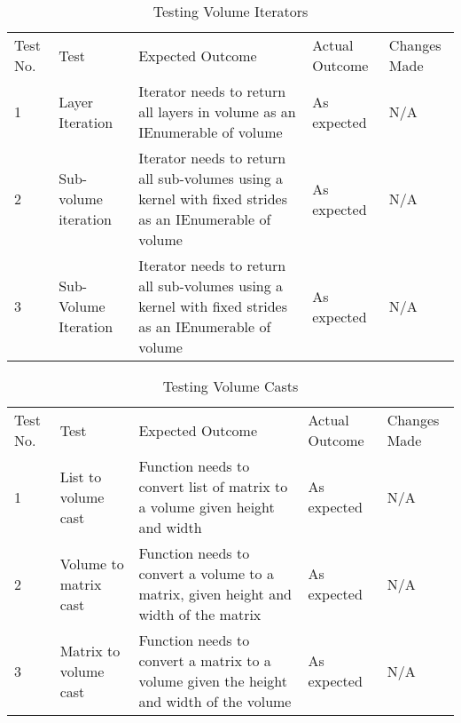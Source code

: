 \begin{table}[H]
\centering
    \begin{tabular}{|p{1cm}|p{4cm}|p{4cm}|p{3cm}|p{2cm}|}
        \hline
        Test No. & Test & Expected Outcome & Actual Outcome & Changes Made \\ \cline{1-5} 
        1 & Layer Iteration & Iterator needs to return all layers in volume as an IEnumerable of volume & As expected & N/A \\
        \cline{1-5}
        2 & Sub-volume iteration & Iterator needs to return all sub-volumes using a kernel with fixed strides as an IEnumerable of volume & As expected & N/A \\
        \cline{1-5}
        3 & Sub-Volume Iteration & Iterator needs to return all sub-volumes using a kernel with fixed strides as an IEnumerable of volume & As expected & N/A \\
        \cline{1-5}
    \end{tabular}
    \caption{Testing Volume Iterators}
    \vspace{0.5cm}
\end{table}

\begin{table}[H]
\centering
    \begin{tabular}{|p{1cm}|p{4cm}|p{4cm}|p{3cm}|p{2cm}|}
        \hline
        Test No. & Test & Expected Outcome & Actual Outcome & Changes Made \\ \cline{1-5} 
        1 & List to volume cast & Function needs to convert list of matrix to a volume given height and width & As expected & N/A \\ \cline{1-5}
        2 & Volume to matrix cast & Function needs to convert a volume to a matrix, given height and width of the matrix & As expected & N/A \\ \cline{1-5}
        3 & Matrix to volume cast & Function needs to convert a matrix to a volume given the height and width of the volume & As expected & N/A \\ \cline{1-5}
    \end{tabular}
    \caption{Testing Volume Casts}
    \vspace{0.5cm}
\end{table}

